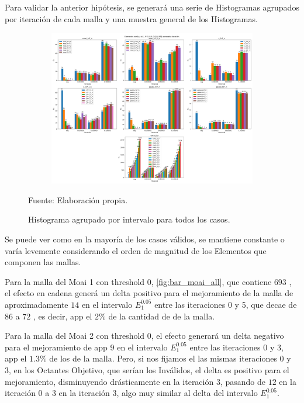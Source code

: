 Para validar la anterior hipótesis, se generará una serie de Histogramas agrupados por iteración de cada malla y una muestra general de los Histogramas.


\begin{figure}[H]
	\centering
	\begin{subfigure}[t]{1.0\textwidth}
		\includegraphics[width=0.75\paperheight, angle=90, origin=c]{figures/analysis/fit_all_bar.png}
	\end{subfigure}
	\caption{ Histograma agrupado por intervalo para todos los casos. }
	Fuente: Elaboración propia.
	\label{fig:fit_all_bar}
\end{figure}

Se puede ver como en la mayoría de los casos válidos, se mantiene constante o varía levemente considerando el orden de magnitud de los Elementos que componen las mallas.



Para la malla del Moai 1 con threshold $0$, \autoref{fig:bar_moai_all}, que contiene $693$ \elements{}, el efecto en cadena generá un delta positivo para el mejoramiento de la malla de aproximadamente $14$ \elements{} en el intervalo $E^{0.05}_{1}$ entre las iteraciones 0 y 5, que decae de $86$ a $72$ \elements{}, es decir, app el $2\%$ de la cantidad de \elements{} de la malla.

Para la malla del Moai 2 con threshold $0$, el efecto generará un delta negativo para el mejoramiento de app $9$ \elements{} en el intervalo $E^{0.05}_{1}$ entre las iteraciones 0 y 3, app el $1.3\%$ de los \elements{} de la malla.  Pero, si nos fijamos el las mismas iteraciones 0 y 3, en los Octantes Objetivo, que serían los \elements{} Inválidos, el delta es positivo para el mejoramiento, disminuyendo drásticamente en la iteración $3$, pasando de $12$ \elements{} en la iteración 0 a $3$ \elements{} en la iteración $3$, algo muy similar al delta del intervalo $E^{0.05}_{1}$.

